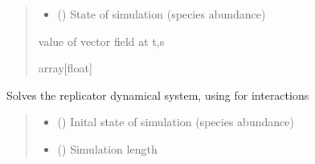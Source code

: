\documentclass[letterpaper,10pt,english]{sphinxmanual}
\begin{document}
\begin{fulllineitems}
\begin{fulllineitems}
\begin{quote}
\begin{description}
\begin{itemize}
\item {} 
\sphinxAtStartPar
{} (\sphinxstyleliteralemphasis{\sphinxupquote{{[}}}\sphinxstyleliteralemphasis{\sphinxupquote{{]}}}) \textendash{} State of simulation (species abundance)

\end{itemize}

\sphinxAtStartPar
value of vector field at t,s

\sphinxAtStartPar
array{[}float{]}

\end{description}\end{quote}

\end{fulllineitems}


\begin{fulllineitems}
\label{\detokenize{friendlynets:friendlyNet.friendlyNet.solve_replicator}}
\pysigstartsignatures
{}
\pysigstopsignatures
\sphinxAtStartPar
Solves the replicator dynamical system, using {\hyperref[\detokenize{friendlynets:friendlyNet.friendlyNet.Adjacency}]{}} for interactions
\begin{quote}\begin{description}
\begin{itemize}
\item {} 
\sphinxAtStartPar
{} (\sphinxstyleliteralemphasis{\sphinxupquote{{[}}}\sphinxstyleliteralemphasis{\sphinxupquote{{]}}}) \textendash{} Inital state of simulation (species abundance)

\item {} 
\sphinxAtStartPar
{} () \textendash{} Simulation length

\end{itemize}


\end{description}
\end{quote}
\end{fulllineitems}
\end{fulllineitems}
\end{document}
